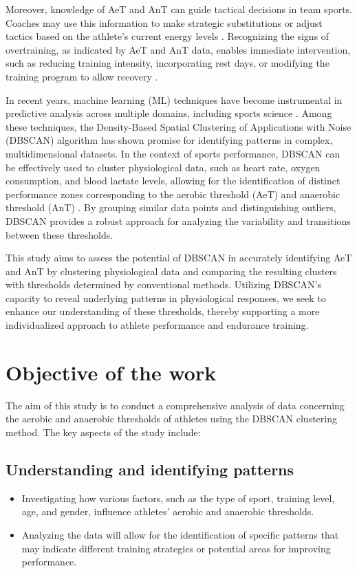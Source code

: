 \documentclass[a4paper,fleqn]{cas-dc}
\begin{document}
Moreover, knowledge of AeT and AnT can guide tactical decisions in team sports. Coaches may use this information to make strategic substitutions or adjust tactics based on the athlete’s current energy levels \cite{ref8, ref9}. Recognizing the signs of overtraining, as indicated by AeT and AnT data, enables immediate intervention, such as reducing training intensity, incorporating rest days, or modifying the training program to allow recovery \cite{ref10}.

In recent years, machine learning (ML) techniques have become instrumental in predictive analysis across multiple domains, including sports science \cite{ref11}. Among these techniques, the Density-Based Spatial Clustering of Applications with Noise (DBSCAN) algorithm has shown promise for identifying patterns in complex, multidimensional datasets. In the context of sports performance, DBSCAN can be effectively used to cluster physiological data, such as heart rate, oxygen consumption, and blood lactate levels, allowing for the identification of distinct performance zones corresponding to the aerobic threshold (AeT) and anaerobic threshold (AnT) \cite{ref12, ref13, ref14}. By grouping similar data points and distinguishing outliers, DBSCAN provides a robust approach for analyzing the variability and transitions between these thresholds.

This study aims to assess the potential of DBSCAN in accurately identifying AeT and AnT by clustering physiological data and comparing the resulting clusters with thresholds determined by conventional methods. Utilizing DBSCAN’s capacity to reveal underlying patterns in physiological responses, we seek to enhance our understanding of these thresholds, thereby supporting a more individualized approach to athlete performance and endurance training.

\section{Objective of the work}

The aim of this study is to conduct a comprehensive analysis of data concerning the aerobic and anaerobic thresholds of athletes using the DBSCAN clustering method. The key aspects of the study include:

\subsection{Understanding and identifying patterns}
\begin{itemize}
    \item Investigating how various factors, such as the type of sport, training level, age, and gender, influence athletes' aerobic and anaerobic thresholds.
    \item Analyzing the data will allow for the identification of specific patterns that may indicate different training strategies or potential areas for improving performance.
\end{itemize}
\end{document}
